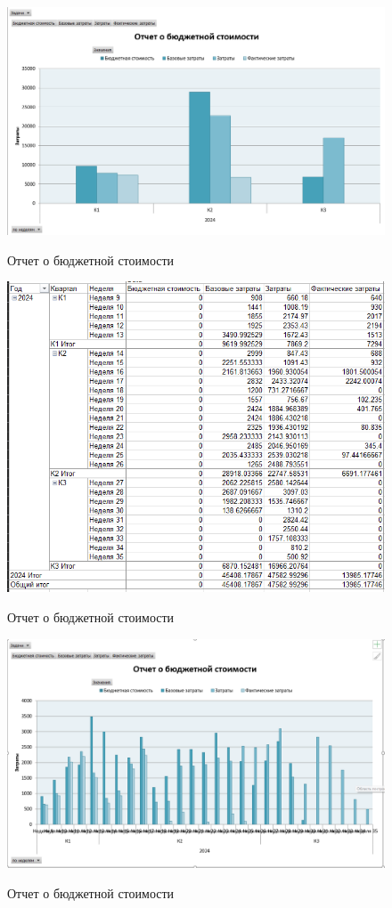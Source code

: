 \begin{figure}[ht!]
	\includegraphics[width=0.75\linewidth]{assets/images/image_2024-03-16_09-06-31.png}
	\label{fig:r2}
	\caption{Отчет о бюджетной стоимости}
\end{figure}
\FloatBarrier

\begin{figure}[ht!]
	\includegraphics[width=0.75\linewidth]{assets/images/image_2024-03-16_09-10-00.png}
	\label{fig:r2}
	\caption{Отчет о бюджетной стоимости}
\end{figure}
\FloatBarrier

\begin{figure}[ht!]
	\includegraphics[width=0.75\linewidth]{assets/images/image_2024-03-16_09-10-56.png}
	\label{fig:r2}
	\caption{Отчет о бюджетной стоимости}
\end{figure}
\FloatBarrier

